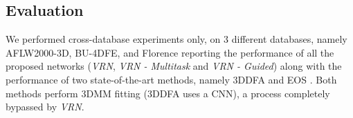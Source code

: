\subsection{Evaluation}

We performed cross-database experiments only, on 3 different
databases, namely AFLW2000-3D, BU-4DFE, and Florence reporting the
performance of all the proposed networks (\textit{VRN}, \textit{VRN -
  Multitask} and \textit{VRN - Guided}) along with the performance of
two state-of-the-art methods, namely 3DDFA \cite{zhu2016face} and EOS
\cite{huber2016multiresolution}. Both methods perform 3DMM
fitting (3DDFA uses a CNN), a process completely bypassed by \textit{VRN}.



